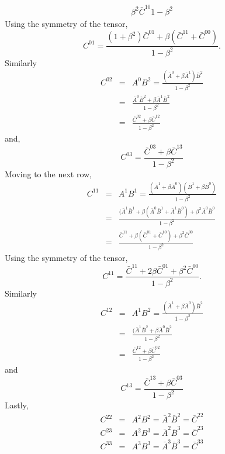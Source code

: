 \begin{enumerate}
\begin{eqnarray*}
{           \beta^2\bar{C}^{10}}{1 - \beta^2}
\end{eqnarray*}
Using the symmetry of the tensor,
\begin{equation}\label{c1e89}
C^{01} = 
\frac{(1 + \beta^2)\bar{C}^{01} + \beta(\bar{C}^{11} + \bar{C}^{00})}
{1 - \beta^2}.
\end{equation}
Similarly
\begin{eqnarray}
C^{02} 
 &=& A^0 B^2 = 
     \frac{(\bar{A}^0 + \beta\bar{A}^1)\bar{B}^2}{1 - \beta^2} \nonumber \\
 &=& \frac{\bar{A}^0\bar{B}^2 + \beta\bar{A}^1\bar{B}^2}
      {1 - \beta^2} \nonumber \\
 &=& \frac{\bar{C}^{02} + \beta\bar{C}^{12}}{1 - \beta^2} \label{c1e90}
\end{eqnarray}
and,
\begin{equation}\label{c1e91}
C^{03} = \frac{\bar{C}^{03} + \beta\bar{C}^{13}}{1 - \beta^2}
\end{equation}
Moving to the next row,
\begin{eqnarray*}
C^{11} &=& 
 A^1 B^1 = 
 \frac{(\bar{A}^1 + \beta\bar{A}^0)(\bar{B}^1 + \beta\bar{B}^0)}{1 - \beta^2}\\
 &=& \frac{(\bar{A}^1\bar{B}^1 + \beta(\bar{A}^0\bar{B}^1 + 
          \bar{A}^1\bar{B}^0) + \beta^2\bar{A}^0\bar{B}^0}{1 - \beta^2} \\
 &=& \frac{\bar{C}^{11} + \beta(\bar{C}^{01} + \bar{C}^{10}) + 
           \beta^2\bar{C}^{00}}{1 - \beta^2}
\end{eqnarray*}
Using the symmetry of the tensor,
\begin{equation}\label{c1e92}
C^{11} = 
\frac{\bar{C}^{11} + 2\beta\bar{C}^{01} + \beta^2\bar{C}^{00}}{1 - \beta^2}.
\end{equation}
Similarly
\begin{eqnarray}
C^{12} &=& 
A^1 B^2 = \frac{(\bar{A}^1 + \beta\bar{A}^0)\bar{B}^2}{1 - \beta^2} \nonumber\\
&=&\frac{(\bar{A}^1\bar{B}^2+\beta\bar{A}^0\bar{B}^2}{1 - \beta^2} \nonumber \\
&=& \frac{\bar{C}^{12} + \beta\bar{C}^{02}}{1 - \beta^2} \label{c1e93}
\end{eqnarray}
and
\begin{equation}\label{c1e94}
C^{13} = \frac{\bar{C}^{13} + \beta\bar{C}^{03}}{1 - \beta^2} 
\end{equation}
Lastly, 
\begin{eqnarray}
C^{22} &=& A^2B^2 = \bar{A}^2\bar{B}^2 = \bar{C}^{22} \label{c1e95} \\
C^{23} &=& A^2B^3 = \bar{A}^2\bar{B}^3 = \bar{C}^{23} \label{c1e96} \\
C^{33} &=& A^3B^3 = \bar{A}^3\bar{B}^3 = \bar{C}^{33} \label{c1e97}
\end{eqnarray}


\end{enumerate}
